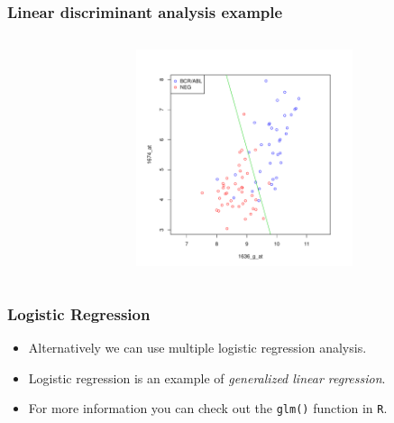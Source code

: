 \begin{frame}
  \frametitle{Linear discriminant analysis example}
\begin{knitrout}\footnotesize
{}\color{fgcolor}\begin{kframe}
\begin{alltt}

 \hlkwb{<-} \hlstd{(}\hlstd{(top50set)[}\hlstd{(}\hlstd{,}\hlstd{),])}
 \hlkwb{<-} \hlstd{(top2, top50set[[}\hlstd{]])}
\end{alltt}
\end{kframe}
\end{knitrout}
\end{frame}




\begin{frame}[plain]
  \begin{columns}
  \begin{column}{0.5\textwidth}
    
  \end{column}

  \begin{column}{0.5\textwidth}
    \includegraphics[width=2.5in]{results/lda}
  \end{column}
\end{columns}
\end{frame}


\begin{frame}
  \frametitle{Logistic Regression}
  \begin{itemize}
  \item Alternatively we can use multiple logistic regression
    analysis.
  \item Logistic regression is an example of \emph{generalized linear
      regression}.
  \item For more information you can check out the \texttt{glm()}
    function in \texttt{R}.
  \end{itemize}
\end{frame}

